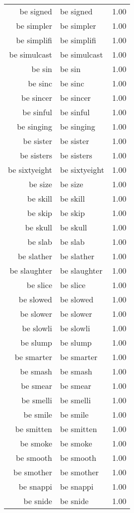 \begin{table}[ht]
\begin{tabular}{rlr}
  be signed & be signed & 1.00 \\ 
  be simpler & be simpler & 1.00 \\ 
  be simplifi & be simplifi & 1.00 \\ 
  be simulcast & be simulcast & 1.00 \\ 
  be sin & be sin & 1.00 \\ 
  be sinc & be sinc & 1.00 \\ 
  be sincer & be sincer & 1.00 \\ 
  be sinful & be sinful & 1.00 \\ 
  be singing & be singing & 1.00 \\ 
  be sister & be sister & 1.00 \\ 
  be sisters & be sisters & 1.00 \\ 
  be sixtyeight & be sixtyeight & 1.00 \\ 
  be size & be size & 1.00 \\ 
  be skill & be skill & 1.00 \\ 
  be skip & be skip & 1.00 \\ 
  be skull & be skull & 1.00 \\ 
  be slab & be slab & 1.00 \\ 
  be slather & be slather & 1.00 \\ 
  be slaughter & be slaughter & 1.00 \\ 
  be slice & be slice & 1.00 \\ 
  be slowed & be slowed & 1.00 \\ 
  be slower & be slower & 1.00 \\ 
  be slowli & be slowli & 1.00 \\ 
  be slump & be slump & 1.00 \\ 
  be smarter & be smarter & 1.00 \\ 
  be smash & be smash & 1.00 \\ 
  be smear & be smear & 1.00 \\ 
  be smelli & be smelli & 1.00 \\ 
  be smile & be smile & 1.00 \\ 
  be smitten & be smitten & 1.00 \\ 
  be smoke & be smoke & 1.00 \\ 
  be smooth & be smooth & 1.00 \\ 
  be smother & be smother & 1.00 \\ 
  be snappi & be snappi & 1.00 \\ 
  be snide & be snide & 1.00 \\ 

\end{tabular}
\end{table}
